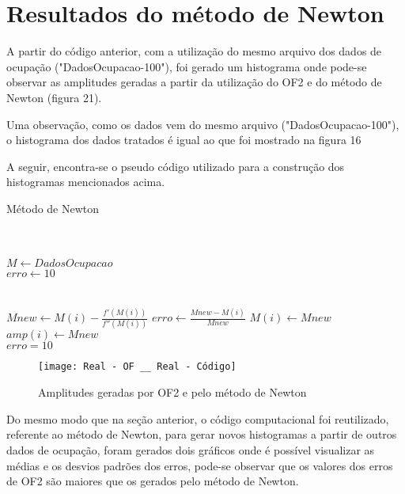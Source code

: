 \section{Resultados do método de Newton}
A partir do código anterior, com a utilização do mesmo arquivo dos dados de ocupação ("DadosOcupacao-100"), foi gerado um histograma onde pode-se observar as amplitudes geradas a partir da utilização do OF2 e do método de Newton (figura 21).

Uma observação, como os dados vem do mesmo arquivo ("DadosOcupacao-100"), o histograma dos dados tratados é igual ao que foi mostrado na figura 16

A seguir, encontra-se o pseudo código utilizado para a construção dos histogramas mencionados acima.

\begin{algorithm}
\caption{Método de Newton}
\Comment{}\\
\\

$M \gets DadosOcupacao$\\
$erro \gets 10 $\\
\\
\\
    \State$Mnew \gets M(i) - \frac{f'(M(i))}{f''(M(i))}$
    \State$erro \gets \frac{Mnew - M(i)}{Mnew}$
    \State$M(i) \gets Mnew$
\EndWhile\\
\State $amp(i) \gets Mnew$\\
\State $erro = 10$  \\
\EndFor
\end{algorithm}


\begin{figure}[H]
    \centering
    \caption{Amplitudes geradas por OF2 e pelo método de Newton}
    \texttt{[image: Real - OF \_\_ Real - Código]}
    \label{OFeNewton}
\end{figure}

Do mesmo modo que na seção anterior, o código computacional foi reutilizado, referente ao método de Newton, para gerar novos histogramas a partir de outros dados de ocupação, foram gerados dois gráficos onde é possível visualizar as médias e os desvios padrões dos erros, pode-se observar que os valores dos erros de OF2 são maiores que os gerados pelo método de Newton.

